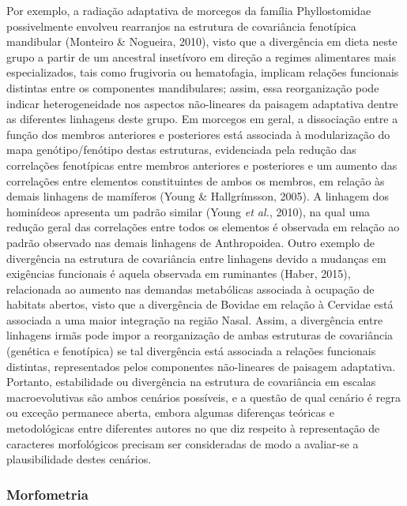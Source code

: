 \documentclass[12pt,twoside]{report}
\begin{document}
Por exemplo, a radiação adaptativa de morcegos da família Phyllostomidae
possivelmente envolveu rearranjos na estrutura de covariância fenotípica
mandibular (Monteiro \& Nogueira, 2010), visto que a divergência em
dieta neste grupo a partir de um ancestral insetívoro em direção a
regimes alimentares mais especializados, tais como frugivoria ou
hematofagia, implicam relações funcionais distintas entre os componentes
mandibulares; assim, essa reorganização pode indicar heterogeneidade nos
aspectos não-lineares da paisagem adaptativa dentre as diferentes
linhagens deste grupo. Em morcegos em geral, a dissociação entre a
função dos membros anteriores e posteriores está associada à
modularização do mapa genótipo/fenótipo destas estruturas, evidenciada
pela redução das correlações fenotípicas entre membros anteriores e
posteriores e um aumento das correlações entre elementos constituintes
de ambos os membros, em relação às demais linhagens de mamíferos (Young
\& Hallgrímsson, 2005). A linhagem dos hominídeos apresenta um padrão
similar (Young \emph{et al.}, 2010), na qual uma redução geral das
correlações entre todos os elementos é observada em relação ao padrão
observado nas demais linhagens de Anthropoidea. Outro exemplo de
divergência na estrutura de covariância entre linhagens devido a
mudanças em exigências funcionais é aquela observada em ruminantes
(Haber, 2015), relacionada ao aumento nas demandas metabólicas associada
à ocupação de habitats abertos, visto que a divergência de Bovidae em
relação à Cervidae está associada a uma maior integração na região
Nasal. Assim, a divergência entre linhagens irmãs pode impor a
reorganização de ambas estruturas de covariância (genética e fenotípica)
se tal divergência está associada a relações funcionais distintas,
representados pelos componentes não-lineares de paisagem adaptativa.
Portanto, estabilidade ou divergência na estrutura de covariância em
escalas macroevolutivas são ambos cenários possíveis, e a questão de
qual cenário é regra ou exceção permanece aberta, embora algumas
diferenças teóricas e metodológicas entre diferentes autores no que diz
respeito à representação de caracteres morfológicos precisam ser
consideradas de modo a avaliar-se a plausibilidade destes cenários.

\subsubsection{Morfometria}\label{morfometria}
\end{document}
